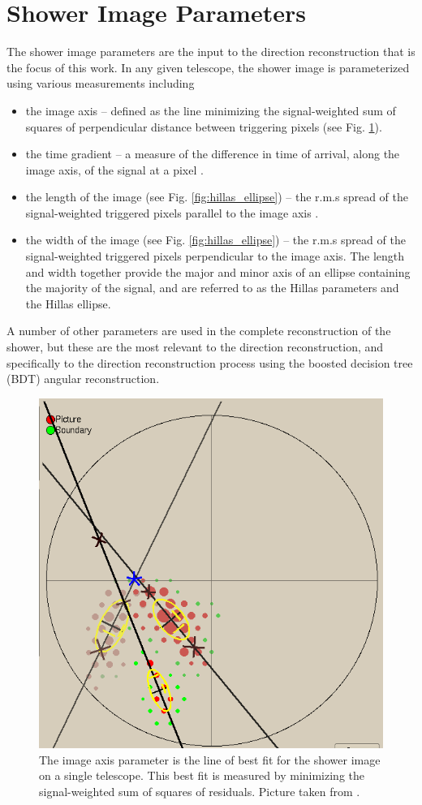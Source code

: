 \documentclass[main.tex]{subfiles}
\begin{document}
\section{Shower Image Parameters}
\label{shower-img-params}
The shower image parameters are the input to the direction reconstruction that is the focus of this work. In any given telescope, the shower image is parameterized using various measurements including
\begin{itemize}
\item the image axis -- defined as the line minimizing the signal-weighted sum of squares of perpendicular distance between triggering pixels (see Fig. \ref{fig:hillas_image_axis}).
\item the time gradient -- a measure of the difference in time of arrival, along the image axis, of the signal at a pixel %
  .
\item the length of the image (see Fig. \ref{fig:hillas_ellipse}) -- the r.m.s spread of the signal-weighted triggered pixels parallel to the image axis \cite{Hillas:1985}.
\item the width of the image (see Fig. \ref{fig:hillas_ellipse}) -- the r.m.s spread of the signal-weighted triggered pixels perpendicular to the image axis. The length and width together provide the major and minor axis of an ellipse containing the majority of the signal, and are referred to as the Hillas parameters and the Hillas ellipse.
\end{itemize}
A number of other parameters are used in the complete reconstruction of the shower, but these are the most relevant to the direction reconstruction, and specifically to the direction reconstruction process using the boosted decision tree (BDT) angular reconstruction.
\begin{figure}[htbp]
  \centering
      \includegraphics[width=0.45\linewidth]{images/img_axis}
      \caption[The image axis parameter.]{The image axis parameter is the line of best fit for the shower image on a single telescope. This best fit is measured by minimizing the signal-weighted sum of squares of residuals. Picture taken from \cite{veritas_web}.}
      \label{fig:hillas_image_axis}
\end{figure}
\end{document}
